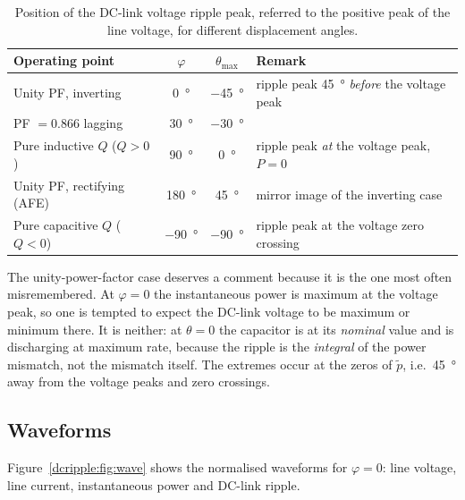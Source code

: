 \begin{table}[htbp]
  \centering
  \caption{Position of the DC-link voltage ripple peak, referred to the positive
  peak of the line voltage, for different displacement angles.}
  \label{dcripple:tab:cases}
  \begin{tabular}{lccl}
    \toprule
    Operating point & $\varphi$ & $\theta_{\max}$ & Remark \\
    \midrule
    Unity PF, inverting        & \SI{0}{\degree}   & \SI{-45}{\degree}
      & ripple peak \SI{45}{\degree} \emph{before} the voltage peak \\
    PF $=0.866$ lagging        & \SI{30}{\degree}  & \SI{-30}{\degree} & \\
    Pure inductive $Q$ ($Q>0$) & \SI{90}{\degree}  & \SI{0}{\degree}
      & ripple peak \emph{at} the voltage peak, $P=0$ \\
    Unity PF, rectifying (AFE) & \SI{180}{\degree} & \SI{+45}{\degree}
      & mirror image of the inverting case \\
    Pure capacitive $Q$ ($Q<0$)& \SI{-90}{\degree} & \SI{-90}{\degree}
      & ripple peak at the voltage zero crossing \\
    \bottomrule
  \end{tabular}
\end{table}

The unity-power-factor case deserves a comment because it is the one most often
misremembered. At $\varphi=0$ the instantaneous power is maximum at the voltage
peak, so one is tempted to expect the DC-link voltage to be maximum or minimum
there. It is neither: at $\theta = 0$ the capacitor is at its \emph{nominal}
value and is discharging at maximum rate, because the ripple is the
\emph{integral} of the power mismatch, not the mismatch itself. The extremes
occur at the zeros of $\tilde p$, i.e.\ \SI{45}{\degree} away from the voltage
peaks and zero crossings.

\subsection{Waveforms}

Figure~\ref{dcripple:fig:wave} shows the normalised waveforms for $\varphi=0$: line
voltage, line current, instantaneous power and DC-link ripple.

